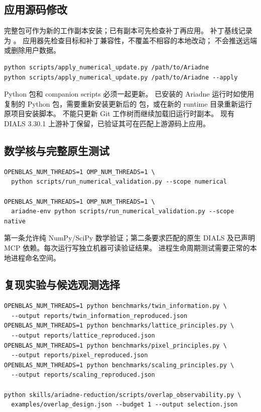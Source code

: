 \documentclass[UTF8,11pt,a4paper,fontset=fandol]{ctexart}
\begin{document}
\subsection{应用源码修改}

完整包可作为新的工作副本安装；已有副本可先检查补丁再应用。
补丁基线记录为 。
应用器先检查目标和补丁兼容性，不覆盖不相容的本地改动；
不会推送远端或删除用户数据。

\begin{lstlisting}
python scripts/apply_numerical_update.py /path/to/Ariadne
python scripts/apply_numerical_update.py /path/to/Ariadne --apply
\end{lstlisting}

Python 包和 companion scripts 必须一起更新。
已安装的 Ariadne 运行时如使用复制的 Python 包，需要重新安装更新后的
 包，或在新的 runtime 目录重新运行原项目安装脚本。
不能只更新 Git 工作树而继续加载旧运行时副本。
现有 DIALS 3.30.1 上游补丁保留，已验证其可在匹配上游源码上应用。

\subsection{数学核与完整原生测试}

\begin{lstlisting}
OPENBLAS_NUM_THREADS=1 OMP_NUM_THREADS=1 \
  python scripts/run_numerical_validation.py --scope numerical

OPENBLAS_NUM_THREADS=1 OMP_NUM_THREADS=1 \
  ariadne-env python scripts/run_numerical_validation.py --scope native
\end{lstlisting}

第一条允许纯 NumPy/SciPy 数学验证；第二条要求匹配的原生 DIALS
及已声明 MCP 依赖。每次运行写独立机器可读验证结果。
进程生命周期测试需要正常的本地进程命名空间。

\subsection{复现实验与候选观测选择}

\begin{lstlisting}
OPENBLAS_NUM_THREADS=1 python benchmarks/twin_information.py \
  --output reports/twin_information_reproduced.json
OPENBLAS_NUM_THREADS=1 python benchmarks/lattice_principles.py \
  --output reports/lattice_reproduced.json
OPENBLAS_NUM_THREADS=1 python benchmarks/pixel_principles.py \
  --output reports/pixel_reproduced.json
OPENBLAS_NUM_THREADS=1 python benchmarks/scaling_principles.py \
  --output reports/scaling_reproduced.json

python skills/ariadne-reduction/scripts/overlap_observability.py \
  examples/overlap_design.json --budget 1 --output selection.json
\end{lstlisting}
\end{document}

